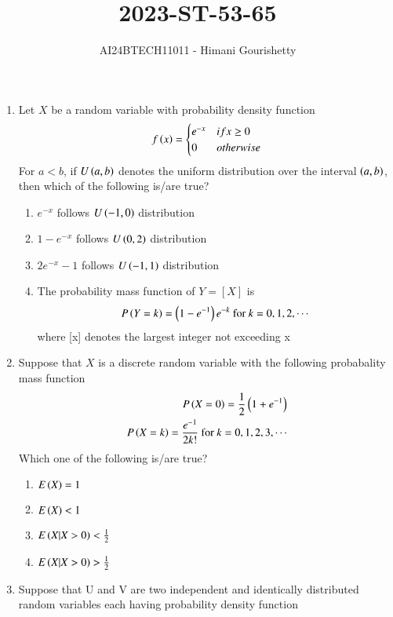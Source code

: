 \documentclass[journal,12pt,onecolumn]{IEEEtran}
\theoremstyle{remark}
\begin{document}

\vspace{3cm}

\title{2023-ST-53-65}
\author{AI24BTECH11011 - Himani Gourishetty}
\maketitle
\bigskip

\renewcommand{\thefigure}{\theenumi}
\renewcommand{\thetable}{\theenumi}
\begin{enumerate}
\item Let $X$ be a random variable with probability density function 
\[
f\left(x\right)=
\begin{cases}
    e^{-x} & if x\geq 0\\
    0 & otherwise
\end{cases}
\]
For $a<b$, if $U\left(a,b\right)$ denotes the uniform distribution over the interval $\left(a,b\right)$, then which of the following is/are true?
\begin{enumerate}
    \item $e^{-x}$ follows $U\left(-1,0\right)$ distribution
    \item $1-e^{-x}$ follows $U\left(0,2\right)$ distribution
 \item $2e^{-x}-1$ follows $U\left(-1,1\right)$ distribution
 \item The probability mass function of $Y=[X]$ is $$P\left(Y=k\right)=\left(1-e^{-1}\right)e^{-k} \text{ for } k=0,1,2,\cdots$$
 where [x] denotes the largest integer not exceeding x
\end{enumerate}
\item Suppose that $X$ is a discrete random variable with the following probabality mass function 
\begin{align}
    P\left(X=0\right)=\frac{1}{2}\left(1+e^{-1}\right)\\
    P\left(X=k\right)=\frac{e^{-1}}{2k!} \text{ for } k=0,1,2,3,\cdots
\end{align}
Which one of the following is/are true?
\begin{enumerate}
    \item $E\left(X\right)=1$
    \item $E\left(X\right)<1$
    \item $E\left(X|X>0\right)<\frac{1}{2}$
    \item $E\left(X|X>0\right)>\frac{1}{2}$
\end{enumerate}
\item Suppose that U and V are two independent and identically distributed random variables each having probability density function

\end{enumerate}
\end{document}
